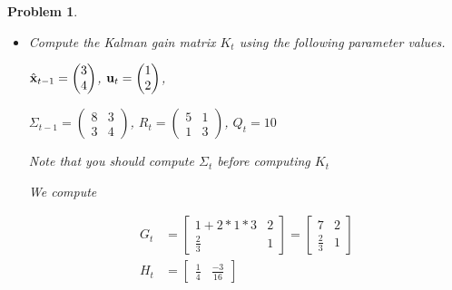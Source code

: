 \documentclass{article}
\newtheorem{problem}{Problem}
\begin{document}
\begin{problem}
\begin{itemize}
\item Compute the Kalman gain matrix $K_t$ using the following parameter values.

$\hat{\bf x}_{t-1} = \begin{pmatrix} 3 \\ 4 \end{pmatrix}$,
${\bf u}_t = \begin{pmatrix} 1 \\ 2 \end{pmatrix}$,

$\Sigma_{t-1} = \begin{pmatrix} 8 & 3 \\ 3 & 4 \end{pmatrix}$,
$R_t = \begin{pmatrix} 5 & 1 \\ 1 & 3 \end{pmatrix}$,
$Q_t = 10$

Note that you should compute $\Sigma_t$ before computing $K_t$
\begin{tcolorbox}
We compute

\begin{align*}
 G_t &= \begin{bmatrix}
        1+2*1*3 & 2
        \\
        \frac{2}{3} & 1
       \end{bmatrix} = \begin{bmatrix}
        7 & 2
        \\
        \frac{2}{3} & 1
       \end{bmatrix} 
    \\
 H_t &= \begin{bmatrix}
        \frac{1}{4}
        &
        \frac{-3}{16}
       \end{bmatrix}
\end{align*}


\end{tcolorbox}
\end{itemize}
\end{problem}
\end{document}
